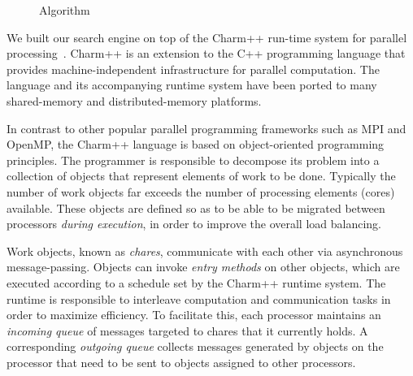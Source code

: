 \documentclass[times, 10pt,twocolumn]{article}
\begin{document}
\begin{figure}[htpb]
\small
\begin{boxedminipage}{\columnwidth}
\begin{algorithmic}[1]
  \EndIf
\EndFunction
\label{codelisting}
\end{algorithmic}
\end{boxedminipage}
\caption{Algorithm}
\end{figure}

\label{ParSSSE}
We built our search engine on top of the {\sc Charm++} run-time
system for parallel processing~\cite{kale93charm,kale09charm}.  {\sc Charm++}
is an extension to the C++ programming language that provides
machine-independent infrastructure for parallel computation.  The language and
its accompanying runtime system have been ported to many shared-memory and
distributed-memory platforms.

In contrast to other popular parallel programming frameworks such as {\sc MPI}
and {\sc OpenMP}, the {\sc Charm++} language is based on object-oriented
programming principles.  The programmer is responsible to decompose its problem
into a collection of objects that represent elements of work to be done.
Typically the number of work objects far exceeds the number of processing
elements (cores) available.  These objects are defined so as to be able to be
migrated between processors {\em during execution}, in order to improve the
overall load balancing.  

Work objects, known as {\em chares}, communicate with each other via
asynchronous message-passing.  Objects can invoke {\em entry methods} on other
objects, which are executed according to a schedule set by the {\sc Charm++}
runtime system.  The runtime is responsible to interleave computation and
communication tasks in order to maximize efficiency.  To facilitate this, each
processor maintains an {\em incoming queue} of messages targeted to chares that
it currently holds.  A corresponding {\em outgoing queue} collects messages
generated by objects on the processor that need to be sent to objects assigned
to other processors.
\end{document}
